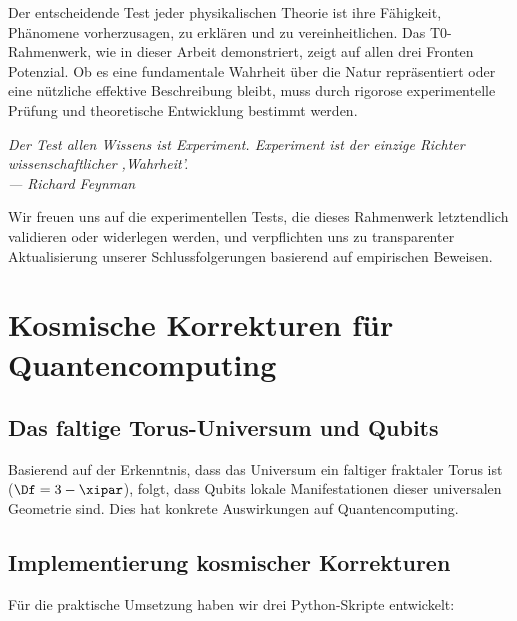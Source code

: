 Der entscheidende Test jeder physikalischen Theorie ist ihre Fähigkeit, Phänomene vorherzusagen, zu erklären und zu vereinheitlichen. Das T0-Rahmenwerk, wie in dieser Arbeit demonstriert, zeigt auf allen drei Fronten Potenzial. Ob es eine fundamentale Wahrheit über die Natur repräsentiert oder eine nützliche effektive Beschreibung bleibt, muss durch rigorose experimentelle Prüfung und theoretische Entwicklung bestimmt werden.

\begin{center}
	\textit{Der Test allen Wissens ist Experiment. Experiment ist der einzige Richter wissenschaftlicher ,Wahrheit'.}\\
	\textit{--- Richard Feynman}
\end{center}

Wir freuen uns auf die experimentellen Tests, die dieses Rahmenwerk letztendlich validieren oder widerlegen werden, und verpflichten uns zu transparenter Aktualisierung unserer Schlussfolgerungen basierend auf empirischen Beweisen.

\section{Kosmische Korrekturen für Quantencomputing}
\label{sec:cosmic_corrections}

\subsection{Das faltige Torus-Universum und Qubits}

Basierend auf der Erkenntnis, dass das Universum ein faltiger fraktaler Torus ist 
($\Df = 3 - \xipar$), folgt, dass Qubits lokale Manifestationen dieser 
universalen Geometrie sind. Dies hat konkrete Auswirkungen auf Quantencomputing.

\subsection{Implementierung kosmischer Korrekturen}

Für die praktische Umsetzung haben wir drei Python-Skripte entwickelt:

